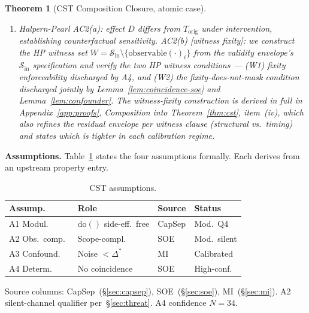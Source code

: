 \documentclass[conference]{IEEEtran}
\newtheorem{theorem}{Theorem}
\newcommand{\Korig}{T_\text{orig}}
\newcommand{\Dstar}{\Delta^{*}}
\begin{document}
\begin{theorem}[CST Composition Closure, atomic case]
\begin{enumerate}[label=(\roman*)]
{  actual world is pre-intervention.}
\item Halpern-Pearl AC2(a): effect $D$ differs from $\Korig$ under
  intervention, establishing counterfactual sensitivity. AC2(b)
  [witness fixity]: we construct the HP witness set
  $W = \mathcal{S}_\text{in} \setminus \{\text{observable}(\cdot)_i\}$
  from the validity envelope's $\mathcal{S}_\text{in}$ specification
  and verify the two HP witness conditions --- (W1) fixity
  enforceability discharged by A4, and (W2) the
  fixity-does-not-mask condition discharged jointly by
  Lemma~\ref{lem:coincidence-soe} and
  Lemma~\ref{lem:confounder}. The witness-fixity construction is
  derived in full in Appendix~\ref{app:proofs}, Composition into
  Theorem~\ref{thm:cst}, item~(iv), which also refines the residual
  envelope per witness clause (structural vs.\ timing) and states
  which is tighter in each calibration regime.
\end{enumerate}
\end{theorem}

\textbf{Assumptions.} Table~\ref{tab:assumptions} states the four
assumptions formally. Each derives from an upstream property entry.

\begin{table}[tb]
  \caption{CST assumptions.}
  \label{tab:assumptions}
  \centering
  \small
  \begin{tabular}{@{}p{}p{}p{}p{}@{}}
  \toprule
  Assump.\ & Role & Source & Status \\
  \midrule
  A1 Modul.\           & $\text{do}()$ side-eff.\ free & CapSep
                       & Mod.\ Q4 \\
  A2 Obs.\ comp.\      & Scope-compl.\                 & SOE
                       & Mod.\ silent \\
  A3 Confound.\        & Noise $<\Dstar$               & MI
                       & Calibrated \\
  A4 Determ.\          & No coincidence                & SOE
                       & High-conf. \\
  \bottomrule
  \end{tabular}

  \vspace{0.3em}
  \footnotesize{Source columns: CapSep~(\S\ref{sec:capsep}),
  SOE~(\S\ref{sec:soe}), MI~(\S\ref{sec:mi}). A2 silent-channel
  qualifier per~\S\ref{sec:threat}. A4 confidence $N{=}34$.}
\end{table}
\end{document}
